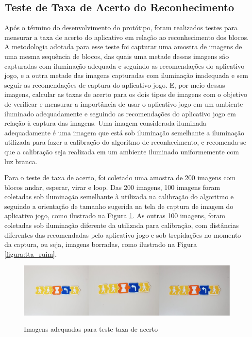 \subsection{\textbf{Teste de Taxa de Acerto do Reconhecimento}}

Após o término do desenvolvimento do protótipo, foram realizados testes para mensurar a taxa de acerto do aplicativo em relação ao reconhecimento dos blocos. A metodologia adotada para esse teste foi capturar uma amostra de imagens de uma mesma sequência de blocos, das quais uma metade dessas imagens são capturadas com iluminação adequada e seguindo as recomendações do aplicativo jogo, e a outra metade das imagens capturadas com iluminação inadequada e sem seguir as recomendações de captura do aplicativo jogo. E, por meio dessas imagens, calcular as taxas de acerto para os dois tipos de imagens com o objetivo de verificar e mensurar a importância de usar o aplicativo jogo em um ambiente iluminado adequadamente e seguindo as recomendações do aplicativo jogo em relação à captura das imagens. Uma imagem considerada iluminada adequadamente é uma imagem que está sob  iluminação semelhante a iluminação utilizada para fazer a calibração do algoritmo de reconhecimento, e recomenda-se que a calibração seja realizada em um ambiente iluminado uniformemente com luz branca. 

Para o teste de taxa de acerto, foi coletado uma amostra de 200 imagens com blocos andar, esperar, virar e loop. Das 200 imagens, 100 imagens foram coletadas sob iluminação semelhante à utilizada na calibração do algoritmo e seguindo a orientação de tamanho sugerida na tela de captura de imagem do aplicativo jogo, como ilustrado na Figura \ref{figura:tta_boa}. As outras 100 imagens, foram coletadas sob iluminação diferente da utilizada para calibração, com distâncias diferentes das recomendadas pelo aplicativo jogo e sob trepidações no momento da captura, ou seja, imagens borradas, como ilustrado na Figura \ref{figura:tta_ruim}.

\begin{figure}[H]
    \caption{Imagens adequadas para teste taxa de acerto}
    \centering
    \includegraphics[width=15cm]{Imagens/Cap5/tta_boa.PNG}
    \label{figura:tta_boa}
\end{figure}

